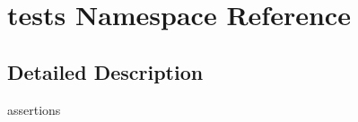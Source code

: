 \hypertarget{namespacetests}{
\section{\-t\-e\-s\-t\-s \-N\-a\-m\-e\-s\-p\-a\-c\-e \-R\-e\-f\-e\-r\-e\-n\-c\-e}
\label{namespacetests}
}


\subsection{Detailed Description}
assertions 